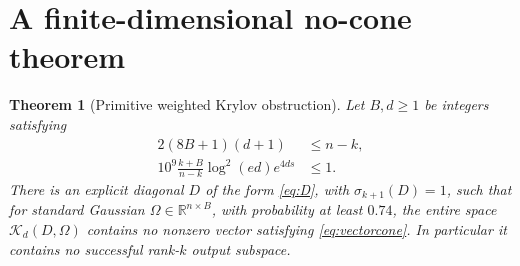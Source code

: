 \documentclass[11pt]{article}
\newtheorem{theorem}{Theorem}[section]
\theoremstyle{definition}
\newcommand{\R}{\mathbb R}
\newcommand{\K}{\mathcal K}
\begin{document}
\section{A finite-dimensional no-cone theorem}\label{sec:primitive}
\begin{theorem}[Primitive weighted Krylov obstruction]\label{thm:primitive}
Let $B,d\ge1$ be integers satisfying
\begin{align}
2(8B+1)(d+1)&\le n-k,\label{eq:budgetcondition}\\
10^9\frac{k+B}{n-k}\log^2(ed)e^{4ds}&\le1.\label{eq:analyticcondition}
\end{align}
There is an explicit diagonal $D$ of the form \eqref{eq:D}, with $\sigma_{k+1}(D)=1$, such that for standard Gaussian $\Omega\in\R^{n\times B}$, with probability at least $0.74$, the entire space $\K_d(D,\Omega)$ contains no nonzero vector satisfying \eqref{eq:vectorcone}. In particular it contains no successful rank-$k$ output subspace.
\end{theorem}
\end{document}
